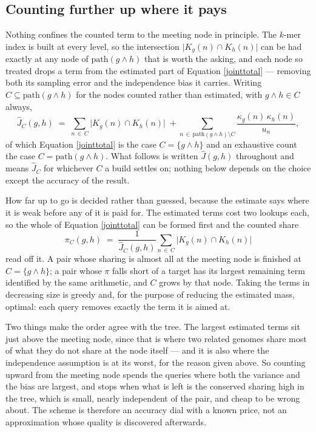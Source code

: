 \documentclass[pdflatex,sn-vancouver-num]{sn-jnl}
\begin{document}
\subsection{Counting further up where it pays}\label{extendcount}

Nothing confines the counted term to the meeting node in principle. The $k$-mer index is built at
every level, so the intersection $\lvert K_g(n) \cap K_h(n) \rvert$ can be had exactly at any node of
$\mathrm{path}(g \wedge h)$ that is worth the asking, and each node so treated drops a term from the
estimated part of Equation \eqref{jointtotal} --- removing both its sampling error and the
independence bias it carries. Writing $C \subseteq \mathrm{path}(g \wedge h)$ for the nodes counted
rather than estimated, with $g \wedge h \in C$ always,
%
\begin{equation}
  \widehat{J}_C(g,h) \;=\; \sum_{n \,\in\, C} \lvert K_g(n) \cap K_h(n) \rvert
    \;+\!\! \sum_{n \,\in\, \mathrm{path}(g \wedge h) \setminus C} \!\!
    \frac{\kappa_g(n)\,\kappa_h(n)}{u_n} ,
  \label{jointadaptive}
\end{equation}
%
of which Equation \eqref{jointtotal} is the case $C = \{g \wedge h\}$ and an exhaustive count the
case $C = \mathrm{path}(g \wedge h)$. What follows is written $\widehat{J}(g,h)$ throughout and
means $\widehat{J}_C$ for whichever $C$ a build settles on; nothing below depends on the choice
except the accuracy of the result.

How far up to go is decided rather than guessed, because the estimate says where it is weak before
any of it is paid for. The estimated terms cost two lookups each, so the whole of
Equation \eqref{jointtotal} can be formed first and the counted share
%
\begin{equation}
  \pi_C(g,h) \;=\; \frac{1}{\widehat{J}_C(g,h)} \sum_{n \,\in\, C}
    \lvert K_g(n) \cap K_h(n) \rvert
  \label{countedshare}
\end{equation}
%
read off it. A pair whose sharing is almost all at the meeting node is finished at $C = \{g \wedge
h\}$; a pair whose $\pi$ falls short of a target has its largest remaining term identified by the
same arithmetic, and $C$ grows by that node. Taking the terms in decreasing size is greedy and, for
the purpose of reducing the estimated mass, optimal: each query removes exactly the term it is aimed
at.

Two things make the order agree with the tree. The largest estimated terms sit just above the
meeting node, since that is where two related genomes share most of what they do not share at the
node itself --- and it is also where the independence assumption is at its worst, for the reason
given above. So counting upward from the meeting node spends the queries where both the variance and
the bias are largest, and stops when what is left is the conserved sharing high in the tree, which is
small, nearly independent of the pair, and cheap to be wrong about. The scheme is therefore an
accuracy dial with a known price, not an approximation whose quality is discovered afterwards.
\end{document}

